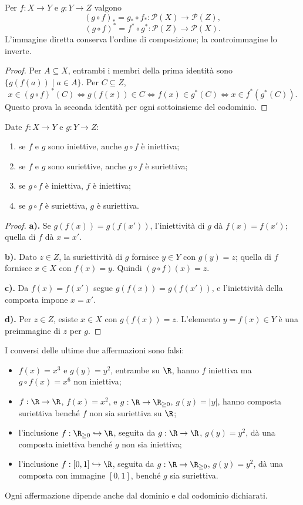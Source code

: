 \begin{proposizione}
Per $f:X\to Y$ e $g:Y\to Z$ valgono
\[
(g\circ f)_*=g_*\circ f_*:\mathcal P(X)\to\mathcal P(Z),
\]
\[
(g\circ f)^*=f^*\circ g^*:\mathcal P(Z)\to\mathcal P(X).
\]
L'immagine diretta conserva l'ordine di composizione; la controimmagine lo inverte.
\end{proposizione}
\begin{proof}
Per $A\subseteq X$, entrambi i membri della prima identità sono $\{g(f(a))\mid a\in A\}$. Per $C\subseteq Z$,
\[
x\in(g\circ f)^*(C)\iff g(f(x))\in C
\iff f(x)\in g^*(C)\iff x\in f^*(g^*(C)).
\]
Questo prova la seconda identità per ogni sottoinsieme del codominio.
\end{proof}

\begin{proposizione}\label{prop:composte}
Date $f:X\to Y$ e $g:Y\to Z$:
\begin{enumerate}[label=\alph*)]
  \item se $f$ e $g$ sono iniettive, anche $g\circ f$ è iniettiva;
  \item se $f$ e $g$ sono suriettive, anche $g\circ f$ è suriettiva;
  \item se $g\circ f$ è iniettiva, $f$ è iniettiva;
  \item se $g\circ f$ è suriettiva, $g$ è suriettiva.
\end{enumerate}
\end{proposizione}
\begin{proof}
\textbf{a).} Se $g(f(x))=g(f(x'))$, l'iniettività di $g$ dà $f(x)=f(x')$; quella di $f$ dà $x=x'$.

\textbf{b).} Dato $z\in Z$, la suriettività di $g$ fornisce $y\in Y$ con $g(y)=z$; quella di $f$ fornisce $x\in X$ con $f(x)=y$. Quindi $(g\circ f)(x)=z$.

\textbf{c).} Da $f(x)=f(x')$ segue $g(f(x))=g(f(x'))$, e l'iniettività della composta impone $x=x'$.

\textbf{d).} Per $z\in Z$, esiste $x\in X$ con $g(f(x))=z$. L'elemento $y=f(x)\in Y$ è una preimmagine di $z$ per $g$.
\end{proof}

\begin{esempio}
I conversi delle ultime due affermazioni sono falsi:
\begin{itemize}
  \item $f(x)=x^3$ e $g(y)=y^2$, entrambe su $\R$, hanno $f$ iniettiva ma $g\circ f(x)=x^6$ non iniettiva;
  \item $f:\R\to\R$, $f(x)=x^2$, e $g:\R\to\R_{\ge0}$, $g(y)=|y|$, hanno composta suriettiva benché $f$ non sia suriettiva su $\R$;
  \item l'inclusione $f:\R_{\ge0}\hookrightarrow\R$, seguita da $g:\R\to\R$, $g(y)=y^2$, dà una composta iniettiva benché $g$ non sia iniettiva;
  \item l'inclusione $f:[0,1]\hookrightarrow\R$, seguita da $g:\R\to\R_{\ge0}$, $g(y)=y^2$, dà una composta con immagine $[0,1]$, benché $g$ sia suriettiva.
\end{itemize}
Ogni affermazione dipende anche dal dominio e dal codominio dichiarati.
\end{esempio}

